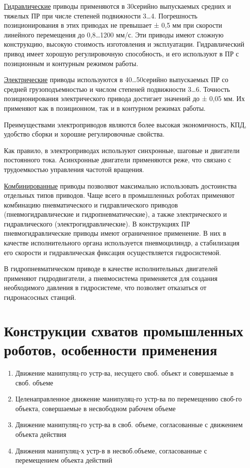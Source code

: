 \documentclass[unicode, 12pt, a4paper, oneside]{article}
\begin{document}
\underline{Гидравлические} приводы применяются в 30\textdiscount серийно выпускаемых средних и тяжелых ПР при числе степеней подвижности 3…4. Погрешность позиционирования в этих приводах не превышает ± 0,5 мм при скорости линейного перемещения до 0,8…1200 мм/с. Эти приводы имеют сложную конструкцию, высокую стоимость изготовления и эксплуатации. Гидравлический привод имеет хорошую регулировочную способность, и его используют в ПР с позиционным и контурным режимом работы.

\underline{Электрические} приводы используются в 40…50\textdiscount серийно выпускаемых ПР со средней грузоподъемностью и числом степеней подвижности 3…6. Точность позиционирования электрического привода достигает значений до ± 0,05 мм. Их применяют как в позиционном, так и в контурном режимах работы. 

Преимуществами электроприводов являются более высокая экономичность, КПД, удобство сборки и хорошие регулировочные свойства. 

Как правило, в электроприводах используют синхронные, шаговые и двигатели постоянного тока. Асинхронные двигатели применяются реже, что связано с трудоемкостью управления частотой вращения.

\underline{Комбинированные} приводы позволяют максимально использовать достоинства отдельных типов приводов. Чаще всего в промышленных роботах применяют комбинацию пневматического и гидравлического приводов (пневмогидравлические и гидропневматические), а также электрического и гидравлического (электрогидравлические). В конструкциях ПР пневмогидравлические приводы имеют ограниченное применение. В них в качестве исполнительного органа используется пневмоцилиндр, а стабилизация его скорости и гидравлическая фиксация осуществляется гидросистемой.

В гидропневматическом приводе в качестве исполнительных двигателей применяют гидродвигатели, а пневмосистема применяется для создания необходимого давления в гидросистеме, что позволяет отказаться от гидронасосных станций.

\section{Конструкции схватов промышленных роботов, особенности применения}
\begin{enumerate}
\item	Движение манипуляц-го устр-ва, несущего своб. объект и совершаемые в своб. объеме

\item	Целенаправленное движение манипуляц-го устр-ва по перемещению своб-го объекта, совершаемые в несвободном рабочем объеме

\item	Движение манипуляц-го устр-ва в своб. объеме, согласованные с движением объекта действия

\item	Движения манипуляц-х устр-в в несвоб.объеме, согласованные с перемещением объекта действий
\end{enumerate}
\end{document}
